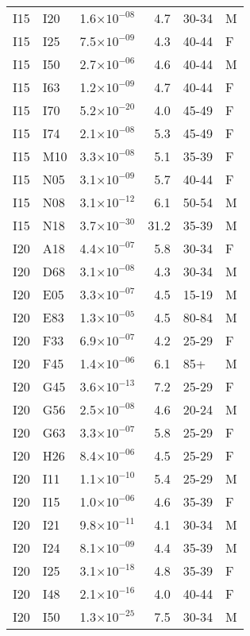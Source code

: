 \begin{longtable}{lllrll}
   I15 & I20 & 1.6$\times10^{-08}$ & 4.7 & 30-34 & M \\ 
   I15 & I25 & 7.5$\times10^{-09}$ & 4.3 & 40-44 & F \\ 
   I15 & I50 & 2.7$\times10^{-06}$ & 4.6 & 40-44 & M \\ 
   I15 & I63 & 1.2$\times10^{-09}$ & 4.7 & 40-44 & F \\ 
   I15 & I70 & 5.2$\times10^{-20}$ & 4.0 & 45-49 & F \\ 
   I15 & I74 & 2.1$\times10^{-08}$ & 5.3 & 45-49 & F \\ 
   I15 & M10 & 3.3$\times10^{-08}$ & 5.1 & 35-39 & F \\ 
   I15 & N05 & 3.1$\times10^{-09}$ & 5.7 & 40-44 & F \\ 
   I15 & N08 & 3.1$\times10^{-12}$ & 6.1 & 50-54 & M \\ 
   I15 & N18 & 3.7$\times10^{-30}$ & 31.2 & 35-39 & M \\ 
   I20 & A18 & 4.4$\times10^{-07}$ & 5.8 & 30-34 & F \\ 
   I20 & D68 & 3.1$\times10^{-08}$ & 4.3 & 30-34 & M \\ 
   I20 & E05 & 3.3$\times10^{-07}$ & 4.5 & 15-19 & M \\ 
   I20 & E83 & 1.3$\times10^{-05}$ & 4.5 & 80-84 & M \\ 
   I20 & F33 & 6.9$\times10^{-07}$ & 4.2 & 25-29 & F \\ 
   I20 & F45 & 1.4$\times10^{-06}$ & 6.1 & 85+ & M \\ 
   I20 & G45 & 3.6$\times10^{-13}$ & 7.2 & 25-29 & F \\ 
   I20 & G56 & 2.5$\times10^{-08}$ & 4.6 & 20-24 & M \\ 
   I20 & G63 & 3.3$\times10^{-07}$ & 5.8 & 25-29 & F \\ 
   I20 & H26 & 8.4$\times10^{-06}$ & 4.5 & 25-29 & F \\ 
   I20 & I11 & 1.1$\times10^{-10}$ & 5.4 & 25-29 & M \\ 
   I20 & I15 & 1.0$\times10^{-06}$ & 4.6 & 35-39 & F \\ 
   I20 & I21 & 9.8$\times10^{-11}$ & 4.1 & 30-34 & M \\ 
   I20 & I24 & 8.1$\times10^{-09}$ & 4.4 & 35-39 & M \\ 
   I20 & I25 & 3.1$\times10^{-18}$ & 4.8 & 35-39 & F \\ 
   I20 & I48 & 2.1$\times10^{-16}$ & 4.0 & 40-44 & F \\ 
   I20 & I50 & 1.3$\times10^{-25}$ & 7.5 & 30-34 & M \\ 

\end{longtable}
